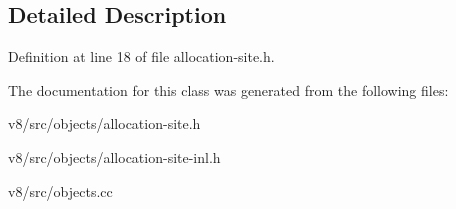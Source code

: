 \subsection{Detailed Description}


Definition at line 18 of file allocation-\/site.\+h.



The documentation for this class was generated from the following files\+:\begin{DoxyCompactItemize}
\item 
v8/src/objects/allocation-\/site.\+h\item 
v8/src/objects/allocation-\/site-\/inl.\+h\item 
v8/src/objects.\+cc\end{DoxyCompactItemize}
